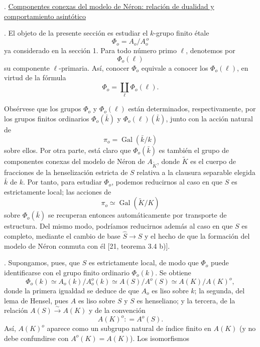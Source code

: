 \par\medskip
{}. \underline{Componentes conexas del modelo de Néron: relación de
dualidad y comportamiento asintótico}

\smallskip
{}. El objeto de la presente sección es estudiar el $k$-grupo finito
étale
\begin{equation}\tag{11.0.1}
\Phi_o=A_o/A_o^{\,o}
\end{equation}
ya considerado en la sección 1. Para todo número primo $\ell$,
denotemos por
\begin{equation*}
\Phi_o(\ell)
\end{equation*}
su componente $\ell$-primaria. Así, conocer $\Phi_o$ equivale a conocer
los $\Phi_o(\ell)$, en virtud de la fórmula
\begin{equation}\tag{11.0.2}
\Phi_o=\coprod_\ell\Phi_o(\ell).
\end{equation}


Obsérvese que los grupos $\Phi_o$ y $\Phi_o(\ell)$ están determinados,
respectivamente, por los grupos finitos ordinarios $\Phi_o(\bar k)$ y
$\Phi_o(\ell)(\bar k)$, junto con la acción natural de
\begin{equation*}
\pi_o=\operatorname{Gal}(\bar k/k)
\end{equation*}
sobre ellos. Por otra parte, está claro que $\Phi_o(\bar k)$ es también
el grupo de componentes conexas del modelo de Néron de
$A_{\widetilde K}$, donde $\widetilde K$ es el cuerpo de fracciones de
la henselización estricta de $S$ relativa a la clausura separable
elegida $\bar k$ de $k$. Por tanto, para estudiar $\Phi_o$, podemos
reducirnos al caso en que $S$ es estrictamente local; las acciones de
\begin{equation*}
\pi_o\simeq\operatorname{Gal}(\widetilde K/K)
\end{equation*}
sobre $\Phi_o(\bar k)$ se recuperan entonces automáticamente por
transporte de estructura. Del mismo modo, podríamos reducirnos además
al caso en que $S$ es completo, mediante el cambio de base
$\widehat S\longrightarrow S$ y el hecho de que la formación del modelo
de Néron conmuta con él [21, teorema 3.4 b)].

\smallskip
{}. Supongamos, pues, que $S$ es estrictamente local, de modo que
$\Phi_o$ puede identificarse con el grupo finito ordinario
$\Phi_o(k)$. Se obtiene
\begin{equation}\tag{11.1.1}
\Phi_o(k)\simeq A_o(k)/A_o^o(k)
 \simeq A(S)/A^o(S)
 \simeq A(K)/A(K)^o,
\end{equation}
donde la primera igualdad se deduce de que $A_o$ es liso sobre $k$; la
segunda, del lema de Hensel, pues $A$ es liso sobre $S$ y $S$ es
henseliano; y la tercera, de la relación
$A(S)\xrightarrow{\sim}A(K)$ y de la convención
\begin{equation}\tag{11.1.2}
A(K)^o\mathrel{\mathop:}=A^o(S).
\end{equation}
Así, $A(K)^o$ aparece como un subgrupo natural de índice finito en
$A(K)$ (y no debe confundirse con $A^o(K)=A(K)$). Los isomorfismos

